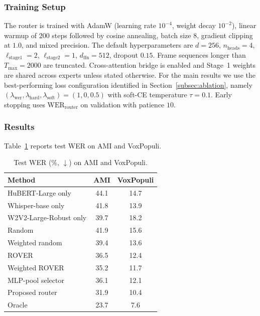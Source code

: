 \documentclass[journal]{IEEEtran}
\begin{document}
\subsubsection{Training Setup}

The router is trained with AdamW (learning rate $10^{-4}$, weight
decay $10^{-2}$), linear warmup of $200$ steps followed by cosine
annealing, batch size $8$, gradient clipping at $1.0$, and mixed
precision. The default hyperparameters are $d=256$, $n_{\text{heads}}=4$,
$\ell_{\text{stage1}}=2$, $\ell_{\text{stage2}}=1$,
$d_{\text{ffn}}=512$, dropout $0.15$. Frame sequences longer than
$T_{\max}=2000$ are truncated. Cross-attention bridge is enabled and
Stage~1 weights are shared across experts unless stated otherwise.
For the main results we use the best-performing loss configuration
identified in Section~\ref{subsec:ablation}, namely
$(\lambda_{\text{wer}},\lambda_{\text{hard}},\lambda_{\text{soft}})=(1,0,0.5)$
with soft-CE temperature $\tau=0.1$. Early stopping uses
$\mathrm{WER}_{\text{router}}$ on validation with patience $10$.

\subsubsection{Results}

Table~\ref{tab:main_results} reports test WER on AMI and VoxPopuli.

\begin{table}[t]
\centering
\caption{Test WER (\%, $\downarrow$) on AMI and VoxPopuli.}
\label{tab:main_results}
\small
\begin{tabular}{lcc}
\toprule
Method & AMI & VoxPopuli \\
\midrule
HuBERT-Large only             & 44.1 & 14.7 \\
Whisper-base only             & 41.8 & 13.9 \\
W2V2-Large-Robust only        & 39.7 & 18.2 \\
\midrule
Random                        & 41.9 & 15.6 \\
Weighted random               & 39.4 & 13.6 \\
ROVER                         & 36.5 & 12.4 \\
Weighted ROVER                & 35.2 & 11.7 \\
MLP-pool selector             & 36.1 & 12.1 \\
Proposed router               & 31.9 & 10.4 \\
\midrule
Oracle                        & 23.7 &  7.6 \\
\bottomrule
\end{tabular}
\end{table}
\end{document}
